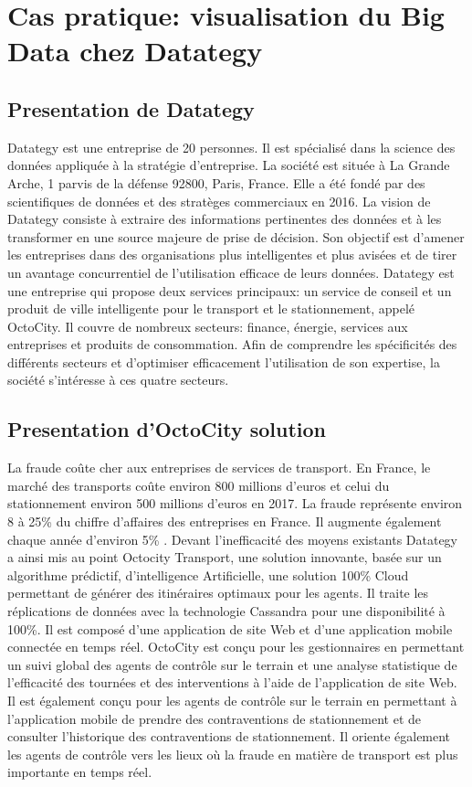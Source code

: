 \documentclass[french, a4paper, 12pt]{report}
\begin{document}
\chapter{Cas pratique: visualisation du Big Data chez Datategy}
\section{Presentation de Datategy}
Datategy est une entreprise de 20 personnes. Il est spécialisé dans la science des données appliquée à la stratégie d'entreprise. La société est située à La Grande Arche, 1 parvis de la défense 92800, Paris, France.
Elle a été fondé par des scientifiques de données et des stratèges commerciaux en 2016.
La vision de Datategy consiste à extraire des informations pertinentes des données et à les transformer en une source majeure de prise de décision. Son objectif est d'amener les entreprises dans des organisations plus intelligentes et plus avisées et de tirer un avantage concurrentiel de l'utilisation efficace de leurs données.
Datategy est une entreprise qui propose deux services principaux: un service de conseil et un produit de ville intelligente pour le transport et le stationnement, appelé OctoCity.
Il couvre de nombreux secteurs: finance, énergie, services aux entreprises et produits de consommation. Afin de comprendre les spécificités des différents secteurs et d’optimiser efficacement l’utilisation de son expertise, la société s’intéresse à ces quatre secteurs.

\section{Presentation d’OctoCity solution}
La fraude coûte cher aux entreprises de services de transport. En France, le marché des transports coûte environ 800 millions d'euros et celui du stationnement environ 500 millions d'euros en 2017. La fraude représente environ 8 à 25\% du chiffre d’affaires des entreprises en France. Il augmente également chaque année d'environ 5\% .
Devant l’inefficacité des moyens existants Datategy a ainsi mis au point Octocity Transport, une solution innovante, basée sur un algorithme prédictif, d’intelligence Artificielle, une solution 100\% Cloud permettant de générer des itinéraires optimaux pour les agents. Il traite les réplications de données avec la technologie Cassandra pour une disponibilité à 100\%. Il est composé d'une application de site Web et d'une application mobile connectée en temps réel.
OctoCity est conçu pour les gestionnaires en permettant un suivi global des agents de contrôle sur le terrain et une analyse statistique de l'efficacité des tournées et des interventions à l'aide de l'application de site Web. Il est également conçu pour les agents de contrôle sur le terrain en permettant à l’application mobile de prendre des contraventions de stationnement et de consulter l’historique des contraventions de stationnement. Il oriente également les agents de contrôle vers les lieux où la fraude en matière de transport est plus importante en temps réel.
\end{document}

